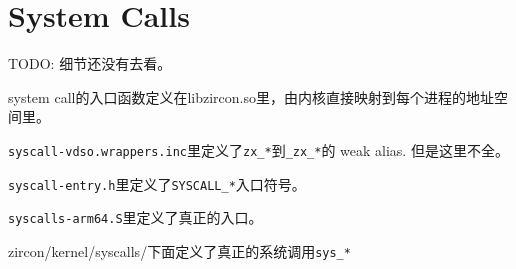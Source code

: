 \section{System Calls}

TODO: 细节还没有去看。

system call的入口函数定义在libzircon.so里，由内核直接映射到每个进程的地址空间里。

\verb|syscall-vdso.wrappers.inc|里定义了\verb|zx_*|到\verb|_zx_*|的
weak alias. 但是这里不全。

\verb|syscall-entry.h|里定义了\verb|SYSCALL_*|入口符号。

\verb|syscalls-arm64.S|里定义了真正的入口。

zircon/kernel/syscalls/下面定义了真正的系统调用\verb|sys_*|

